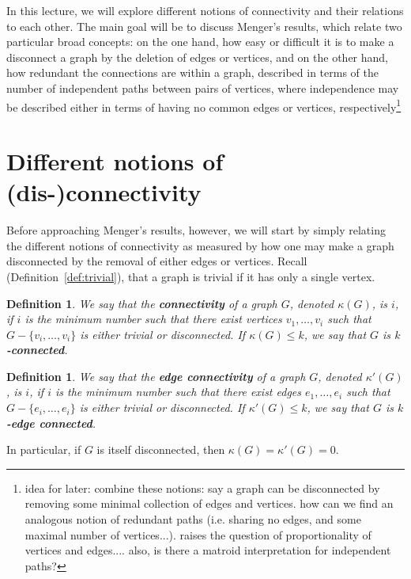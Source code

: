 \documentclass[12pt]{report}
\theoremstyle{plain}
\newtheorem{defn}[thm]{Definition}
\newcommand{\Xb}[1]{\textbf{#1}\index{#1}}
\begin{document}
In this lecture, we will explore different notions of connectivity and
their relations to each other. The main goal will be to discuss Menger's
results, which relate two particular broad concepts: on the one hand, how
easy or difficult it is to make a disconnect a graph by the deletion of
edges or vertices, and on the other hand, how redundant the connections are
within a graph, described in terms of the number of independent paths
between pairs of vertices, where independence may be described either in
terms of having no common edges or vertices, respectively\footnote{idea for later: combine these notions: say a graph can be disconnected by
removing some minimal collection of edges and vertices. how can we find an
analogous notion of redundant paths (i.e. sharing no edges, and some
maximal number of vertices...). raises the question of proportionality of
vertices and edges.... also, is there a matroid interpretation for
independent paths?}

\section{Different notions of (dis-)connectivity}

Before approaching Menger's results, however, we will start by simply
relating the different notions of connectivity as measured by how one may
make a graph disconnected by the removal of either edges or vertices.
Recall (Definition~\ref{def:trivial}), that a graph is trivial if it has
only a single vertex.

\begin{defn} \label{def:connectivity}
We say that the \Xb{connectivity} of a graph $G$, denoted $\kappa(G)$, is
$i$, if $i$ is the minimum number such that there exist vertices $v_1,
\ldots, v_i$ such that $G - \{v_i, \ldots, v_i\}$ is either trivial or
disconnected. If $\kappa(G) \leq k$, we say that $G$ is
\textbf{$k$-connected}.
\end{defn}

\begin{defn} \label{def:edge connectivity}
We say that the \Xb{edge connectivity} of a graph $G$, denoted
$\kappa'(G)$, is $i$, if $i$ is the minimum number such that there exist
edges $e_1, \ldots, e_i$ such that $G - \{e_i, \ldots, e_i\}$ is either
trivial or disconnected. If $\kappa'(G) \leq k$, we say that $G$ is
\textbf{$k$-edge connected}.
\end{defn}

In particular, if $G$ is itself disconnected, then $\kappa(G) = \kappa'(G)
= 0$.
\end{document}
